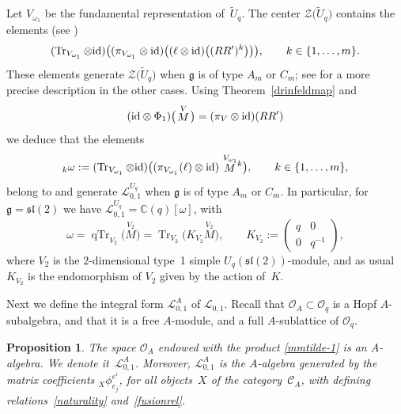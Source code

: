 \documentclass[pdftex]{sigma}%
\numberwithin{equation}{section}
\numberwithin{figure}{section}
\newtheorem{prop}[teo]{Proposition}
\newcommand{\Oq}{\Oo_{q}}
\newcommand{\mc}{\mathbb{C}}
\newcommand{\Ll}{{\mathcal L}}
\newcommand{\Oo}{{\mathcal O}}
\begin{document}
\begin{remk}\label{centermatrk} Let $V_{\omega_1}$ be the fundamental representation of~$\tilde{U}_q$. The center $\mathcal{Z}\big(\tilde{U}_q\big)$ contains the elements (see \cite{Bau2,FRT})
\begin{equation*}%
(\operatorname{Tr}_{V_{\omega_1}}\otimes {\rm id})\big((\pi_{V_{\omega_1}}\otimes {\rm id})\big((\ell\otimes {\rm id})\big((RR')^k\big)\big)\big), \qquad k\in \{1,\dots,m\}.
\end{equation*}
These elements generate $\mathcal{Z}\big(\tilde{U}_q\big)$ when $\mathfrak{g}$ is of type $A_m$ or $C_m$; see \cite{Bau2} for a more precise description in the other cases. Using Theorem~\ref{drinfeldmap} and
\begin{equation*}%
({\rm id} \otimes \Phi_1)\big(\!\stackrel{V}{M}\!\big) = (\pi_V \otimes {\rm id})(RR')
\end{equation*}
we deduce that the elements
\begin{equation*}%
{}_k\omega := (\operatorname{Tr}_{V_{\omega_1}}\otimes {\rm id})\big((\pi_{V_{\omega_1}}(\ell)\otimes {\rm id})\stackrel{V_{\omega_1}}{M}{}^{\!\! k} \big),\qquad k\in \{1,\dots,m\},
\end{equation*}
belong to and generate $\Ll_{0,1}^{U_q}$ when $\mathfrak{g}$ is of type $A_m$ or $C_m$. In particular, for $\mathfrak{g} = {\mathfrak{sl}}(2)$ we have $\Ll_{0,1}^{U_q} = \mc(q)[\omega]$, with
\begin{equation}\label{omegadef}
\omega = \operatorname{qTr}_{V_2}\big(\!\stackrel{V_2}{M} \big) = \operatorname{Tr}_{V_2}\big(K_{V_2}\stackrel{V_2}{M} \big) ,\qquad K_{V_2} := \begin{pmatrix} q & 0\\ 0&q^{-1}\end{pmatrix}\!,
\end{equation}
where $V_{2}$ is the $2$-dimensional type~1 simple $U_q({\mathfrak{sl}}(2))$-module, and as usual $K_{V_2}$ is the endomorphism of $V_2$ given by the action of~$K$.
\end{remk}

Next we define the integral form $\Ll_{0,1}^A$ of $\Ll_{0,1}$. Recall that ${\mathcal O}_A \subset \Oq$ is a Hopf $A$-subalgebra, and that it is a free $A$-module, and a full $A$-sublattice of $\Oq$.

\begin{prop} \label{defL01A} The space $\Oo_A$ endowed with the product \eqref{mmtilde-1} is an $A$-algebra. We denote it~$\Ll_{0,1}^A$. Moreover, $\Ll_{0,1}^A$ is the $A$-algebra generated by the matrix coefficients ${}_X\phi^{e^i}_{e_j}$, for all objects~$X$ of the category~$\mathcal{C}_A$, with defining relations~\eqref{naturality} and~\eqref{fusionrel}.
\end{prop}
\end{document}
